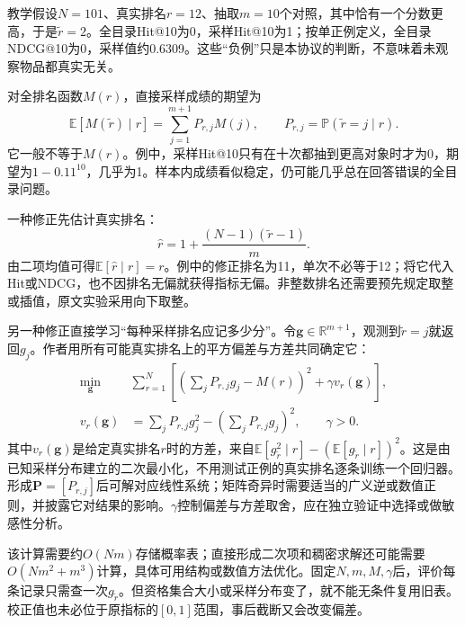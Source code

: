 教学假设$N=101$、真实排名$r=12$、抽取$m=10$个对照，其中恰有一个分数更高，于是$\widetilde r=2$。全目录Hit@10为0，采样Hit@10为1；按单正例定义，全目录NDCG@10为0，采样值约0.6309。这些“负例”只是本协议的判断，不意味着未观察物品都真实无关。

对全排名函数$M(r)$，直接采样成绩的期望为
\begin{equation}
  \mathbb E[M(\widetilde r)\mid r]
    =\sum_{j=1}^{m+1}P_{r,j}M(j),
  \qquad P_{r,j}=\mathbb P(\widetilde r=j\mid r).
  \label{eq:rs-evaluation-sampled-expectation}
\end{equation}
它一般不等于$M(r)$。例中，采样Hit@10只有在十次都抽到更高对象时才为0，期望为$1-0.11^{10}$，几乎为1。样本内成绩看似稳定，仍可能几乎总在回答错误的全目录问题。

一种修正先估计真实排名：
\begin{equation}
  \widehat r
    =1+\frac{(N-1)(\widetilde r-1)}{m}.
  \label{eq:rs-evaluation-rank-correction}
\end{equation}
由二项均值可得$\mathbb E[\widehat r\mid r]=r$。例中的修正排名为11，单次不必等于12；将它代入Hit或NDCG，也不因排名无偏就获得指标无偏。非整数排名还需要预先规定取整或插值，原文实验采用向下取整。

另一种修正直接学习“每种采样排名应记多少分”。令$\bm g\in\mathbb R^{m+1}$，观测到$\widetilde r=j$就返回$g_j$。作者用所有可能真实排名上的平方偏差与方差共同确定它：
\begin{equation}
  \begin{aligned}
    \min_{\bm g}\quad&
      \sum_{r=1}^{N}
      \left[\left(\sum_jP_{r,j}g_j-M(r)\right)^2
        +\gamma v_r(\bm g)\right],\\
    v_r(\bm g)&=\sum_jP_{r,j}g_j^2-
       \left(\sum_jP_{r,j}g_j\right)^2,\qquad\gamma>0.
  \end{aligned}
  \label{eq:rs-evaluation-metric-correction}
\end{equation}
其中$v_r(\bm g)$是给定真实排名$r$时的方差，来自$\mathbb E[g_{\widetilde r}^2\mid r]-(\mathbb E[g_{\widetilde r}\mid r])^2$。这是由已知采样分布建立的二次最小化，不用测试正例的真实排名逐条训练一个回归器。形成$\bm P=[P_{r,j}]$后可解对应线性系统；矩阵奇异时需要适当的广义逆或数值正则，并披露它对结果的影响。$\gamma$控制偏差与方差取舍，应在独立验证中选择或做敏感性分析。

该计算需要约$O(Nm)$存储概率表；直接形成二次项和稠密求解还可能需要$O(Nm^2+m^3)$计算，具体可用结构或数值方法优化。固定$N,m,M,\gamma$后，评价每条记录只需查一次$g_{\widetilde r}$。但资格集合大小或采样分布变了，就不能无条件复用旧表。校正值也未必位于原指标的$[0,1]$范围，事后截断又会改变偏差。

